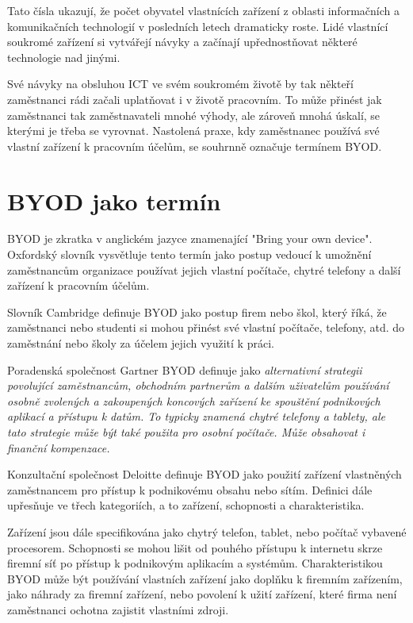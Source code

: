 Tato čísla ukazují, že počet obyvatel vlastnících zařízení z oblasti informačních a komunikačních technologií v posledních letech dramaticky roste. Lidé vlastnící soukromé zařízení si vytvářejí návyky a začínají upřednostňovat některé technologie nad jinými.

Své návyky na obsluhou ICT ve svém soukromém životě by tak někteří zaměstnanci rádi začali uplatňovat i v životě pracovním. To může přinést jak zaměstnanci tak zaměstnavateli mnohé výhody, ale zároveň mnohá úskalí, se kterými je třeba se vyrovnat. Nastolená praxe, kdy zaměstnanec používá své vlastní zařízení k pracovním účelům, se souhrnně označuje termínem BYOD.



\section{BYOD jako termín}

BYOD je zkratka v anglickém jazyce znamenající "Bring your own device". Oxfordský slovník \cite{oxford} vysvětluje tento termín jako postup vedoucí k umožnění zaměstnancům organizace používat jejich vlastní počítače, chytré telefony a další zařízení k pracovním účelům. 

Slovník Cambridge \cite{cambridge} definuje BYOD jako postup firem nebo škol, který říká, že zaměstnanci nebo studenti si mohou přinést své vlastní počítače, telefony, atd.  do zaměstnání nebo školy za účelem jejich využití k práci. 

Poradenská společnost Gartner \cite{GartnerBYOD} BYOD definuje jako \textit{alternativní strategii povolující zaměstnancům, obchodním partnerům a dalším uživatelům používání osobně zvolených a zakoupených koncových zařízení ke spouštění podnikových aplikací a přístupu k datům. To typicky znamená chytré telefony a tablety, ale tato strategie může být také použita pro osobní počítače. Může obsahovat i finanční kompenzace.}

Konzultační společnost Deloitte \cite{DeloitteBYOD} definuje BYOD jako použití zařízení vlastněných zaměstnancem pro přístup k podnikovému obsahu nebo sítím. Definici dále upřesňuje ve třech kategoriích, a to zařízení, schopnosti a charakteristika. 

Zařízení jsou dále specifikována jako chytrý telefon, tablet, nebo počítač vybavené procesorem. Schopnosti se mohou lišit od pouhého přístupu k internetu skrze firemní síť po přístup k podnikovým aplikacím a systémům. Charakteristikou BYOD může být používání vlastních zařízení jako doplňku k firemním zařízením, jako náhrady za firemní zařízení, nebo povolení k užití zařízení, které firma není zaměstnanci ochotna zajistit vlastními zdroji. 

